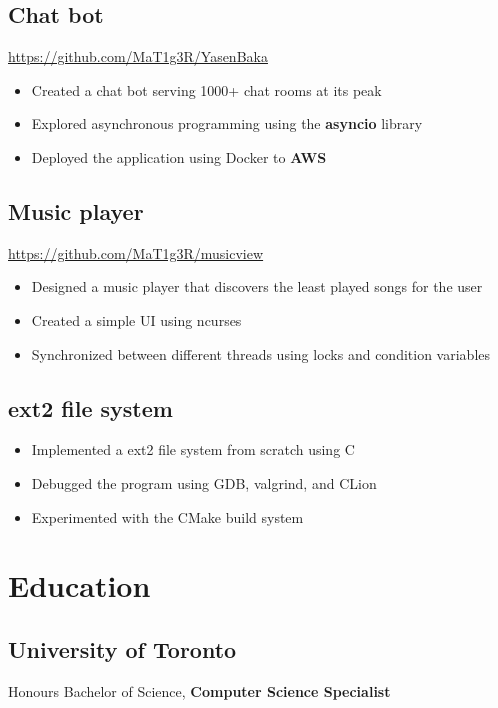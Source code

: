 \documentclass[letterpaper,12pt,oneside]{article}
\newcommand{\smallurl}[1]{\footnotesize{\url{#1}}\normalsize}
\begin{document}
\subsection*{Chat bot \hfill {}}
\smallurl{https://github.com/MaT1g3R/YasenBaka}
\begin{itemize}
      \setlength\itemsep{0em}
      \item Created a chat bot serving 1000+ chat rooms at its peak
      \item Explored asynchronous programming using the \textbf{asyncio} library
      \item Deployed the application using Docker to \textbf{AWS}
\end{itemize}

\subsection*{Music player \hfill {}}
\smallurl{https://github.com/MaT1g3R/musicview}
\begin{itemize}
      \setlength\itemsep{0em}
      \item Designed a music player that discovers the least played songs for the user
      \item Created a simple UI using ncurses
      \item Synchronized between different threads using locks and condition variables
\end{itemize}

\subsection*{ext2 file system \hfill {}}
\begin{itemize}
      \setlength\itemsep{0em}
      \item Implemented a ext2 file system from scratch using C
      \item Debugged the program using GDB, valgrind, and CLion
      \item Experimented with the CMake build system
\end{itemize}

\section*{Education}
\subsection*{University of Toronto \hfill {}}
Honours Bachelor of Science, \textbf{Computer Science Specialist}
\end{document}
